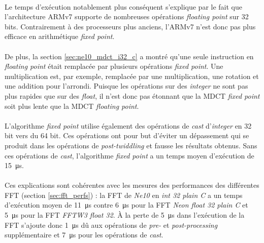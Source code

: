\documentclass{article}
\begin{document}
    \paragraph{}
    Le temps d'exécution notablement plus conséquent s'explique par le fait que l'architecture ARMv7 supporte de nombreuses opérations \emph{floating point} sur 32 bits. Contrairement à des processeurs plus anciens, l'ARMv7 n'est donc pas plus efficace en arithmétique \emph{fixed point}.

    \paragraph{}
    De plus, la section \ref{sec:ne10_mdct_i32_c} a montré qu'une seule instruction en \emph{floating point} était remplacée par plusieurs opérations \emph{fixed point}. Une multiplication est, par exemple, remplacée par une multiplication, une rotation et une addition pour l'arrondi. Puisque les opérations sur des \emph{integer} ne sont pas plus rapides que sur des \emph{float}, il n'est donc pas étonnant que la MDCT \emph{fixed point} soit plus lente que la MDCT \emph{floating point}.

    \paragraph{}
    L'algorithme \emph{fixed point} utilise également des opérations de \emph{cast} d'\emph{integer} en 32 bit vers du 64 bit. Ces opérations ont pour but d'éviter un dépassement qui se produit dans les opérations de \emph{post-twiddling} et fausse les résultats obtenus. Sans ces opérations de \emph{cast}, l'algorithme \emph{fixed point} a un temps moyen d'exécution de \SI{15}{\micro\second}.

    \paragraph{}
    Ces explications sont cohérentes avec les mesures des performances des différentes FFT (section \ref{sec:fft_perfs}) : la FFT de \emph{Ne10} en \emph{int 32 plain C} a un temps d'exécution moyen de \SI{11}{\micro\second} contre \SI{6}{\micro\second} pour la FFT \emph{Neon float 32 plain C} et \SI{5}{\micro\second} pour la FFT \emph{FFTW3 float 32}. À la perte de \SI{5}{\micro\second} dans l'exécution de la FFT s'ajoute donc \SI{1}{\micro\second} dû aux opérations de \emph{pre-} et \emph{post-processing} supplémentaire et \SI{7}{\micro\second} pour les opérations de \emph{cast}.
\end{document}
